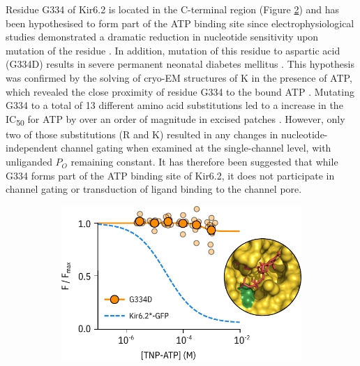 Residue G334 of Kir6.2 is located in the C-terminal region (Figure \ref{ch5fig:g334d}) and has been hypothesised to form part of the ATP binding site since electrophysiological studies demonstrated a dramatic reduction in nucleotide sensitivity upon mutation of the residue \cite{drain_katp_1998, li_open_2002, li_ligand-dependent_2005}.
In addition, mutation of this residue to aspartic acid (G334D) results in severe permanent neonatal diabetes mellitus \cite{masia_atp-binding_2007-1}.
This hypothesis was confirmed by the solving of cryo-EM structures of K\ATP{} in the presence of ATP, which revealed the close proximity of residue G334 to the bound ATP \cite{lee_molecular_2017, martin_anti-diabetic_2017, li_structure_2017, puljung_cryo-electron_2018-1}.
Mutating G334 to a total of 13 different amino acid substitutions led to a increase in the IC\textsubscript{50} for ATP by over an order of magnitude in excised patches \cite{li_ligand-dependent_2005}.
However, only two of those substitutions (R and K) resulted in any changes in nucleotide-independent channel gating when examined at the single-channel level, with unliganded $P_O$ remaining constant.
It has therefore been suggested that while G334 forms part of the ATP binding site of Kir6.2, it does not participate in channel gating or transduction of ligand binding to the channel pore.

\begin{figure}[h]
	\centering
	\begin{subfigure}[t]{0.5\textwidth}
		\caption{}\label{ch5fig:g334d_1}
		\centering
		\includegraphics[width=\textwidth]{g334d_1.pdf}
	\end{subfigure}
	\caption[G334D abolishes nucleotide binding at Kir6.2]{
	}\label{ch5fig:g334d}
\end{figure}

